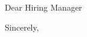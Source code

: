 \documentclass[10pt,letter]{letter}
\def\hm{Jane Doe} %
\begin{document}
\begin{letter}{}

\opening{Dear Hiring Manager}


\setlength\parindent{.5in}



 

\closing{Sincerely,}
\end{letter}
\end{document}
